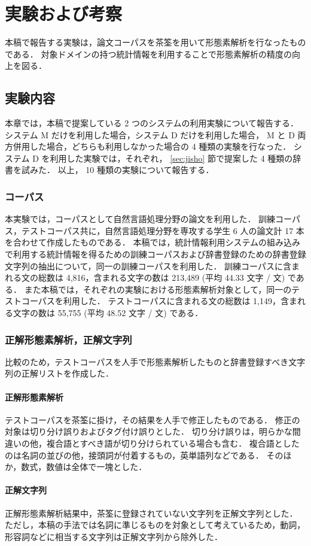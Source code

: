 \section{実験および考察}
本稿で報告する実験は，論文コーパスを茶筌を用いて形態素解析を行なったものである．
対象ドメインの持つ統計情報を利用することで形態素解析の精度の向上を図る．
\subsection{実験内容}
\label{sec:experiments}
本章では，本稿で提案している 2 つのシステムの利用実験について報告する．
システム M だけを利用した場合，システム D だけを利用した場合， M と D 両方併用した場合，どちらも利用しなかった場合の 4 種類の実験を行なった．
システム D を利用した実験では，それぞれ， \ref{sec:jisho} 節で提案した 4 種類の辞書を試みた．
以上， 10 種類の実験について報告する．
\subsubsection{コーパス}
本実験では，コーパスとして自然言語処理分野の論文を利用した．
訓練コーパス，テストコーパス共に，自然言語処理分野を専攻する学生 6 人の論文計 17 本を合わせて作成したものである．
本稿では，統計情報利用システムの組み込みで利用する統計情報を得るための訓練コーパスおよび辞書登録のための辞書登録文字列の抽出について，同一の訓練コーパスを利用した．
訓練コーパスに含まれる文の総数は 4,816，含まれる文字の数は 213,489 (平均 44.33 文字 / 文) である．
また本稿では，それぞれの実験における形態素解析対象として，同一のテストコーパスを利用した．
テストコーパスに含まれる文の総数は 1,149，含まれる文字の数は 55,755 (平均 48.52 文字 / 文) である．
\subsubsection{正解形態素解析，正解文字列}
\label{sec:seikaikeitaisokaiseki}
比較のため，テストコーパスを人手で形態素解析したものと辞書登録すべき文字列の正解リストを作成した．
\paragraph{正解形態素解析}
テストコーパスを茶筌に掛け，その結果を人手で修正したものである．
修正の対象は切り分け誤りおよびタグ付け誤りとした．
切り分け誤りは，明らかな間違いの他，複合語とすべき語が切り分けられている場合も含む．
複合語としたのは名詞の並びの他，接頭詞が付着するもの，英単語列などである．
そのほか，数式，数値は全体で一塊とした．
\paragraph{正解文字列}
正解形態素解析結果中，茶筌に登録されていない文字列を正解文字列とした．
ただし，本稿の手法では名詞に準じるものを対象として考えているため，動詞，形容詞などに相当する文字列は正解文字列から除外した．
